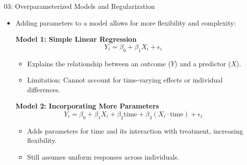 \documentclass{beamer}
\begin{document}
\begin{frame}{03: Overparameterized Models and Regularization}
\begin{itemize}
    \item Adding parameters to a model allows for more flexibility and complexity:
    
    \textbf{Model 1: Simple Linear Regression} \\
    \[
    Y_i = \beta_0 + \beta_1 X_i + \epsilon_i
    \]
    \vspace{-1em}
    \begin{itemize}
        \item Explains the relationship between an outcome (\(Y\)) and a predictor (\(X\)).
        \item Limitation: Cannot account for time-varying effects or individual differences.
    \end{itemize}

    \textbf{Model 2: Incorporating More Parameters} \\
    \[
    Y_i = \beta_0 + \beta_1 X_i + \beta_2 \text{time} + \beta_3 (X_i \cdot \text{time}) + \epsilon_i
    \]
    \vspace{-1em}
    \begin{itemize}
        \item Adds parameters for time and its interaction with treatment, increasing flexibility.
        \item Still assumes uniform responses across individuals.
    \end{itemize}
\end{itemize}
\end{frame}
\end{document}
